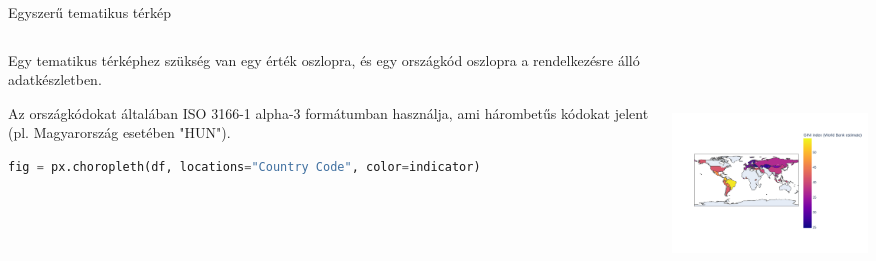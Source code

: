 \documentclass[english, aspectratio=169]{beamer}
\begin{document}
\begin{frame}[fragile]{Egyszerű tematikus térkép}
	\begin{columns}
		\begin{column}{.5\textwidth}
			Egy tematikus térképhez szükség van egy érték oszlopra, és egy országkód oszlopra a rendelkezésre álló adatkészletben.\par\smallskip
			Az országkódokat általában ISO 3166-1 alpha-3 formátumban használja, ami hárombetűs kódokat jelent (pl. Magyarország esetében "HUN").\par\smallskip
			\begin{lstlisting}[language=python]
fig = px.choropleth(df, locations="Country Code", color=indicator)				
			\end{lstlisting}
		\end{column}
		\begin{column}{.5\textwidth}
			\begin{center}
				\includegraphics[width=7cm, height=7cm, keepaspectratio]{images/scatter_20.png}
			\end{center}
		\end{column}
	\end{columns}
\end{frame}
\end{document}
